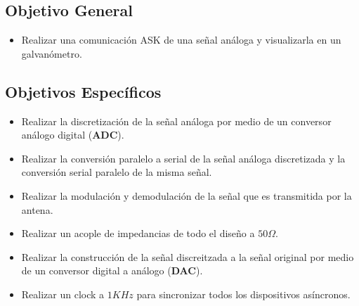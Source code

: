 \documentclass[twocolumn]{IEEEtran}
\begin{document}
\subsection{Objetivo General}
\begin{itemize}
 \item Realizar una comunicación ASK de una señal análoga y visualizarla en un galvanómetro.
\end{itemize}
\subsection{Objetivos Específicos}
\begin{itemize}
 \item Realizar la discretización de la señal análoga por medio de un conversor análogo digital (\textbf{ADC}).
 \item Realizar la conversión paralelo a serial de la señal análoga discretizada y la conversión serial paralelo de la misma señal.
 \item Realizar la modulación y demodulación de la señal que es transmitida por la antena.
 \item Realizar un acople de impedancias de todo el diseño a $50\Omega$.
 \item Realizar la construcción de la señal discreitzada a la señal original por medio de un conversor digital a análogo (\textbf{DAC}).
 \item Realizar un clock a $1KHz$ para sincronizar todos los dispositivos asíncronos.
\end{itemize}
\end{document}
